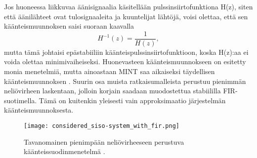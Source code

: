 \documentclass[finnish,12pt]{article}
\begin{document}
Jos huoneessa liikkuvaa äänisignaalia käsitellään pulssinsiirtofunktiona H(z), siten että äänilähteet ovat tulosignaaleita ja kuuntelijat lähtöjä, voisi olettaa, että sen käänteismuunnoksen saisi suoraan kaavalla \begin{equation}
	\label{inverseG}
	H^{-1}(z) = \frac{1}{H(z)},
\end{equation} mutta tämä johtaisi epästabiiliin käänteispulssinsiirtofunktioon, koska H(z):aa ei voida olettaa minimivaiheiseksi. Huonevasteen käänteismuunnokseen on esitetty monia menetelmiä, mutta ainoastaan MINT saa aikaiseksi täydellisen käänteismuunnoksen \cite{MMiyoshi1988}. Suurin osa muista ratkaisumalleista perustuu pienimmän neliövirheen laskentaan, jolloin korjain saadaan muodostettua stabiililla FIR-suotimella. Tämä on kuitenkin yleisesti vain approksimaatio järjestelmän käänteismuunnoksesta.

\begin{figure}[h!]
\centering
\texttt{[image: considered\_siso-system\_with\_fir.png]}
\caption{Tavanomainen pienimpään neliövirheeseen perustuva käänteissuodinmenetelmä \cite{MMiyoshi1988}.}
\label{fig:siso with fir}
\end{figure}
\end{document}
